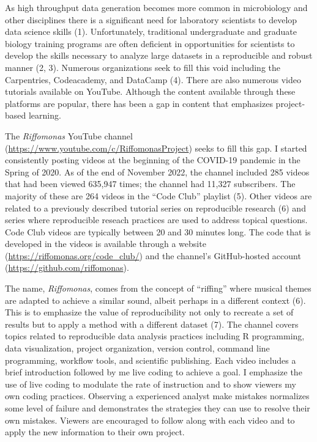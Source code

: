 \documentclass[
]{article}
\begin{document}
As high throughput data generation becomes more common in microbiology
and other disciplines there is a significant need for laboratory
scientists to develop data science skills (1). Unfortunately,
traditional undergraduate and graduate biology training programs are
often deficient in opportunities for scientists to develop the skills
necessary to analyze large datasets in a reproducible and robust manner
(2, 3). Numerous organizations seek to fill this void including the
Carpentries, Codeacademy, and DataCamp (4). There are also numerous
video tutorials available on YouTube. Although the content available
through these platforms are popular, there has been a gap in content
that emphasizes project-based learning.

The \emph{Riffomonas} YouTube channel
(\url{https://www.youtube.com/c/RiffomonasProject}) seeks to fill this
gap. I started consistently posting videos at the beginning of the
COVID-19 pandemic in the Spring of 2020. As of the end of November 2022,
the channel included 285 videos that had been viewed 635,947 times; the
channel had 11,327 subscribers. The majority of these are 264 videos in
the ``Code Club'' playlist (5). Other videos are related to a previously
described tutorial series on reproducible research (6) and series where
reproducible reseach practices are used to address topical questions.
Code Club videos are typically between 20 and 30 minutes long. The code
that is developed in the videos is available through a website
(\url{https://riffomonas.org/code_club/}) and the channel's
GitHub-hosted account (\url{https://github.com/riffomonas}).

The name, \emph{Riffomonas}, comes from the concept of ``riffing'' where
musical themes are adapted to achieve a similar sound, albeit perhaps in
a different context (6). This is to emphasize the value of
reproducibility not only to recreate a set of results but to apply a
method with a different dataset (7). The channel covers topics related
to reproducible data analysis practices including R programming, data
visualization, project organization, version control, command line
programming, workflow tools, and scientific publishing. Each video
includes a brief introduction followed by me live coding to achieve a
goal. I emphasize the use of live coding to modulate the rate of
instruction and to show viewers my own coding practices. Observing a
experienced analyst make mistakes normalizes some level of failure and
demonstrates the strategies they can use to resolve their own mistakes.
Viewers are encouraged to follow along with each video and to apply the
new information to their own project.
\end{document}
